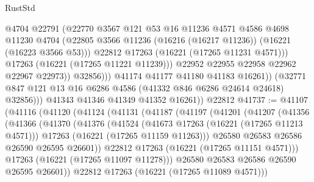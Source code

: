 \begin{lexlean}{RustStd}
\begin{coremodule}
                            @4704
                            @22791
                            (@22770
                              @3567
                              @121
                              @53
                              @16
                              @11236
                              @4571
                              @4586
                              @4698
                              @11230
                              @4704
                              (@22805
                                @3566
                                @11236
                                (@16216 (@16217 @11236))
                                (@16221 (@16223 @3566 @53)))
                              @22812
                              @17263
                              (@16221 (@17265 @11231 @4571)))
                            @17263
                            (@16221 (@17265 @11221 @11239)))
                          @22952
                          @22955
                          @22958
                          @22962
                          @22967
                          @22973))
                      @32856)))
                @41174
                @41177
                @41180
                @41183
                @16261))
            (@32771 @847 @121 @13 @16 @6286 @4586 (@41332 @846 @6286 @24614 @24618) @32856)))
        @41343
        @41346
        @41349
        @41352
        @16261))
    @22812
@41737 := @41107
    (@41116
      (@41120
        (@41124
          (@41131
            (@41187
              (@41197
                (@41201
                  (@41207
                    (@41356
                      (@41366
                        (@41370
                          (@41376
                            (@41524
                              (@41673 @17263 (@16221 (@17265 @11213 @4571)))
                              @17263
                              (@16221 (@17265 @11159 @11263)))
                            @26580
                            @26583
                            @26586
                            @26590
                            @26595
                            @26601))
                        @22812
                        @17263
                        (@16221 (@17265 @11151 @4571)))
                      @17263
                      (@16221 (@17265 @11097 @11278)))
                    @26580
                    @26583
                    @26586
                    @26590
                    @26595
                    @26601))
                @22812
                @17263
                (@16221 (@17265 @11089 @4571)))

\end{coremodule}
\end{lexlean}
